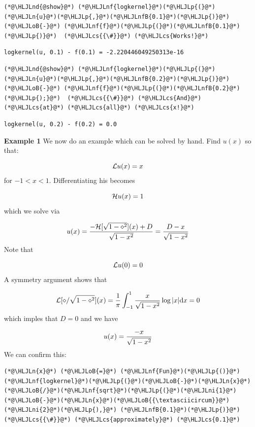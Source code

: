 \documentclass[12pt,a4paper]{article}
\newcommand{\HLJLn}[1]{#1}
\newcommand{\HLJLnd}[1]{\textcolor[RGB]{214,102,97}{#1}}
\newcommand{\HLJLnf}[1]{\textcolor[RGB]{66,102,213}{#1}}
\newcommand{\HLJLnfB}[1]{\textcolor[RGB]{59,151,46}{#1}}
\newcommand{\HLJLni}[1]{\textcolor[RGB]{59,151,46}{#1}}
\newcommand{\HLJLoB}[1]{\textcolor[RGB]{102,102,102}{\textbf{#1}}}
\newcommand{\HLJLp}[1]{#1}
\newcommand{\HLJLcs}[1]{\textcolor[RGB]{153,153,119}{\textit{#1}}}
\def\D{ {\rm d} }
\def\HH{ {\cal H} }
\def\LL{ {\cal L} }
\begin{document}
\begin{lstlisting}
(*@\HLJLnd{@show}@*) (*@\HLJLnf{logkernel}@*)(*@\HLJLp{(}@*)(*@\HLJLn{u}@*)(*@\HLJLp{,}@*)(*@\HLJLnfB{0.1}@*)(*@\HLJLp{)}@*) (*@\HLJLoB{-}@*) (*@\HLJLnf{f}@*)(*@\HLJLp{(}@*)(*@\HLJLnfB{0.1}@*)(*@\HLJLp{)}@*)  (*@\HLJLcs{{\#}}@*) (*@\HLJLcs{Works!}@*)
\end{lstlisting}

\begin{lstlisting}
logkernel(u, 0.1) - f(0.1) = -2.220446049250313e-16
\end{lstlisting}


\begin{lstlisting}
(*@\HLJLnd{@show}@*) (*@\HLJLnf{logkernel}@*)(*@\HLJLp{(}@*)(*@\HLJLn{u}@*)(*@\HLJLp{,}@*)(*@\HLJLnfB{0.2}@*)(*@\HLJLp{)}@*) (*@\HLJLoB{-}@*) (*@\HLJLnf{f}@*)(*@\HLJLp{(}@*)(*@\HLJLnfB{0.2}@*)(*@\HLJLp{);}@*)  (*@\HLJLcs{{\#}}@*) (*@\HLJLcs{And}@*) (*@\HLJLcs{at}@*) (*@\HLJLcs{all}@*) (*@\HLJLcs{x!}@*)
\end{lstlisting}

\begin{lstlisting}
logkernel(u, 0.2) - f(0.2) = 0.0
\end{lstlisting}


\textbf{Example 1} We now do an example which can be solved by hand.  Find $u(x)$ so that: 

\[
\LL u(x) = x
\]
for $-1 < x < 1$. Differentiating his becomes

\[
\HH u(x) = 1
\]
which we solve via

\[
u(x) = {- \HH[\sqrt{1-\diamond^2}](x) + D \over \sqrt{1-x^2}} = {D-x \over \sqrt{1-x^2}}
\]
Note that 

\[
\LL u(0) = 0
\]
A symmetry argument shows that

\[
\LL [\diamond/\sqrt{1-\diamond^2}](x) = {1 \over \pi} \int_{-1}^1 {x \over \sqrt{1-x^2}} \log|x| \D x = 0
\]
which imples that $D = 0$ and we have 

\[
u(x) = {-x \over \sqrt{1-x^2}}
\]
We can confirm this:


\begin{lstlisting}
(*@\HLJLn{x}@*) (*@\HLJLoB{=}@*) (*@\HLJLnf{Fun}@*)(*@\HLJLp{()}@*)
(*@\HLJLnf{logkernel}@*)(*@\HLJLp{(}@*)(*@\HLJLoB{-}@*)(*@\HLJLn{x}@*)(*@\HLJLoB{/}@*)(*@\HLJLnf{sqrt}@*)(*@\HLJLp{(}@*)(*@\HLJLni{1}@*)(*@\HLJLoB{-}@*)(*@\HLJLn{x}@*)(*@\HLJLoB{{\textasciicircum}}@*)(*@\HLJLni{2}@*)(*@\HLJLp{),}@*) (*@\HLJLnfB{0.1}@*)(*@\HLJLp{)}@*) (*@\HLJLcs{{\#}}@*) (*@\HLJLcs{approximately}@*) (*@\HLJLcs{0.1}@*)
\end{lstlisting}
\end{document}
